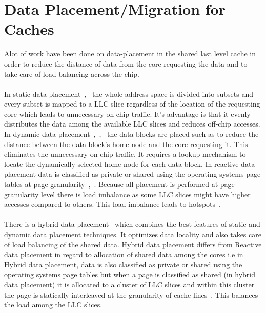 \documentclass{listhesis}
\begin{document}
\section{Data Placement/Migration for Caches}
Alot of work have been done on data-placement in the shared last level cache in order to reduce the distance of data from the core requesting the data and to take care of load balancing across the chip.\\
\\
In static data placement~\cite{cacheDataPlacement1},~\cite{cacheDataPlacement2} the whole address space is divided into subsets and every subset is mapped to a LLC slice regardless of the location of the requesting core which leads to unnecessary on-chip traffic. It’s advantage is that it evenly distributes the data among the available LLC slices and reduces off-chip accesses. In dynamic data placement~\cite{cacheDataPlacement1},~\cite{cacheDataPlacement3},~\cite{cacheDataPlacement4} the data blocks are placed such as to reduce the distance between the data block’s home node and the core requesting it. This eliminates the unnecessary on-chip traffic. It requires a lookup mechanism to locate the dynamically selected home node for each data block. In reactive data placement data is classified as private or shared using the operating systems page tables at page granularity~\cite{cacheDataPlacement4},~\cite{cacheDataPlacement6}. Because all placement is performed at page granularity level there is load imbalance as some LLC slices might have higher accesses compared to others. This load imbalance leads to hotspots~\cite{cacheDataPlacement6}.\\
\\
There is a hybrid data placement~\cite{cacheDataPlacement6} which combines the best features of static and dynamic data placement techniques. It optimizes data locality and also takes care of load balancing of the shared data. Hybrid data placement differs from Reactive data placement in regard to allocation of shared data among the cores i.e in Hybrid data placement, data is also classified as private or shared using the operating systems page tables but when a page is classified as shared (in hybrid data placement) it is allocated to a cluster of LLC slices and within this cluster the page is statically interleaved at the granularity of cache lines~\cite{cacheDataPlacement6}. This balances the load among the LLC slices.\\
\end{document}
